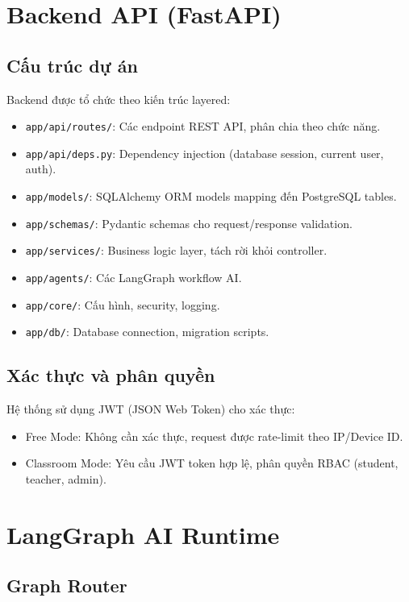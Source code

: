 \section{Backend API (FastAPI)}

\subsection{Cấu trúc dự án}

Backend được tổ chức theo kiến trúc layered:

\begin{itemize}
    \item \texttt{app/api/routes/}: Các endpoint REST API, phân chia theo chức năng.
    \item \texttt{app/api/deps.py}: Dependency injection (database session, current user, auth).
    \item \texttt{app/models/}: SQLAlchemy ORM models mapping đến PostgreSQL tables.
    \item \texttt{app/schemas/}: Pydantic schemas cho request/response validation.
    \item \texttt{app/services/}: Business logic layer, tách rời khỏi controller.
    \item \texttt{app/agents/}: Các LangGraph workflow AI.
    \item \texttt{app/core/}: Cấu hình, security, logging.
    \item \texttt{app/db/}: Database connection, migration scripts.
\end{itemize}

\subsection{Xác thực và phân quyền}

Hệ thống sử dụng JWT (JSON Web Token) cho xác thực:
\begin{itemize}
    \item Free Mode: Không cần xác thực, request được rate-limit theo IP/Device ID.
    \item Classroom Mode: Yêu cầu JWT token hợp lệ, phân quyền RBAC (student, teacher, admin).
\end{itemize}

\section{LangGraph AI Runtime}

\subsection{Graph Router}

